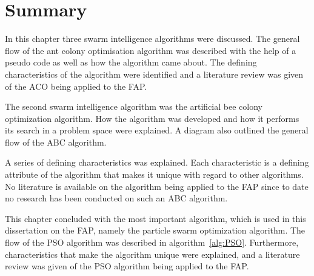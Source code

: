 \section{Summary}
\label{sec:SISummary}
In this chapter three swarm intelligence algorithms were discussed. The general flow of the ant colony optimisation algorithm was described with the help of a pseudo code as well as how the algorithm came about. The defining characteristics of the algorithm were identified and a literature review was given of the \gls{ACO} being applied to the \gls{FAP}.

The second swarm intelligence algorithm was the artificial bee colony optimization algorithm. How the algorithm was developed and how it performs its search in a problem space were explained. A diagram also outlined the general flow of the \gls{ABC} algorithm.

A series of defining characteristics was explained. Each characteristic is a defining attribute of the algorithm that makes it unique with regard to other algorithms. No literature is available on the algorithm being applied to the \gls{FAP} since to date no research has been conducted on such an \gls{ABC} algorithm.

This chapter concluded with the most important algorithm, which is used in this dissertation on the \gls{FAP}, namely the particle swarm optimization algorithm. The flow of the \gls{PSO} algorithm was described in algorithm~\ref{alg:PSO}. Furthermore, characteristics that make the algorithm unique were explained, and a literature review was given of the \gls{PSO} algorithm being applied to the \gls{FAP}.
